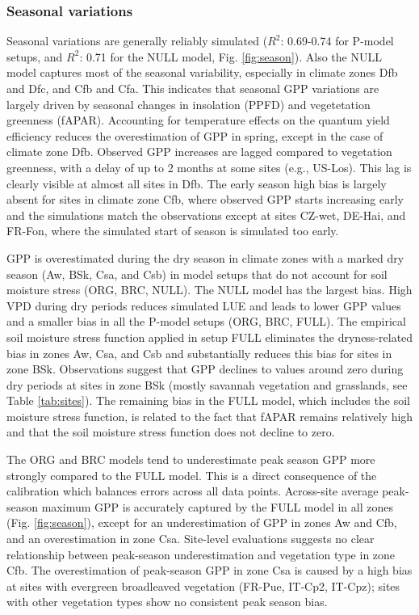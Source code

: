 \documentclass{myreport}
\newcommand{\rsq}{$R^2$}
\begin{document}
\subsubsection{Seasonal variations}
\label{sec:results_seasonal}
Seasonal variations are generally reliably simulated (\rsq : 0.69-0.74 for P-model setups, and \rsq : 0.71 for the NULL model, Fig. \ref{fig:season}). Also the NULL model captures most of the seasonal variability, especially in climate zones Dfb and Dfc, and Cfb and Cfa. This indicates that seasonal GPP variations are largely driven by seasonal changes in insolation (PPFD) and vegetetation greenness (fAPAR). Accounting for temperature effects on the quantum yield efficiency reduces the overestimation of GPP in spring, except in the case of climate zone Dfb. Observed GPP increases are lagged compared to vegetation greenness, with a delay of up to 2 months at some sites (e.g., US-Los). This lag is clearly visible at almost all sites in Dfb. The early season high bias is largely absent for sites in climate zone Cfb, where observed GPP starts increasing early and the simulations match the observations except at sites CZ-wet, DE-Hai, and FR-Fon, where the simulated start of season is simulated too early.

GPP is overestimated during the dry season in climate zones with a marked dry season (Aw, BSk, Csa, and Csb) in model setups that do not account for soil moisture stress (ORG, BRC, NULL). The NULL model has the largest bias. High VPD during dry periods reduces simulated LUE and leads to lower GPP values and a smaller bias in all the P-model setups (ORG, BRC, FULL). The empirical soil moisture stress function applied in setup FULL eliminates the dryness-related bias in zones Aw, Csa, and Csb and substantially reduces this bias for sites in zone BSk. Observations suggest that GPP declines to values around zero during dry periods at sites in zone BSk (mostly savannah vegetation and grasslands, see Table \ref{tab:sites}). The remaining bias in the FULL model, which includes the soil moisture stress function, is related to the fact that fAPAR remains relatively high and that the soil moisture stress function does not decline to zero.

The ORG and BRC models tend to underestimate peak season GPP more strongly compared to the FULL model. This is a direct consequence of the calibration which balances errors across all data points. Across-site average peak-season maximum GPP is accurately captured by the FULL model in all zones (Fig. \ref{fig:season}), except for an underestimation of GPP in zones Aw and Cfb, and an overestimation in zone Csa. Site-level evaluations suggests no clear relationship between peak-season underestimation and vegetation type in zone Cfb. The overestimation of peak-season GPP in zone Csa is caused by a high bias at sites with evergreen broadleaved vegetation (FR-Pue, IT-Cp2, IT-Cpz); sites with other vegetation types show no consistent peak season bias. 
\end{document}
